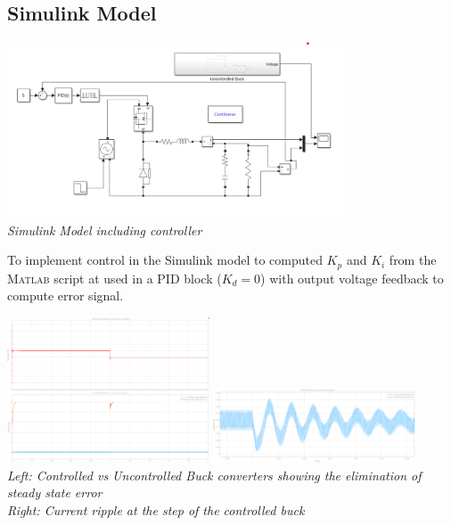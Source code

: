\documentclass[11pt]{article}
\newcommand{\matlab}{\textsc{Matlab }} %
\begin{document}
\begin{preview}
    \section{Simulink Model}
    \begin{center}
        \includegraphics[width=0.75\textwidth]{img/sim.png}\\
        \textit{Simulink Model including controller}

        To implement control in the Simulink model to computed $K_p$ and $K_i$ from the \matlab script at used in a PID block ($K_d = 0$) with output voltage feedback to compute error signal.

        \includegraphics[width=0.45\textwidth]{img/uncontrolled v controlled.png}
        \includegraphics[width=0.45\textwidth]{img/step_zoom.png}\\
        \textit{Left: Controlled vs Uncontrolled Buck converters showing the elimination of steady state error \\  Right: Current ripple at the step of the controlled buck}
    \end{center}
    

\end{preview}
\end{document}
